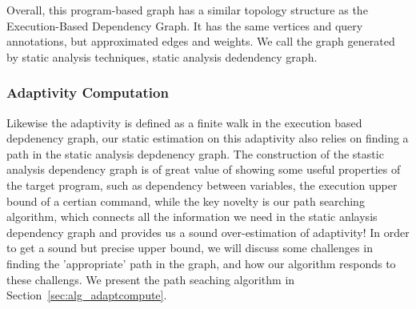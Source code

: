 Overall, this program-based graph has a similar topology structure as 
the Execution-Based Dependency Graph. It has the same
vertices and query annotations, but approximated edges and weights. We call the graph generated by static analysis techniques, static analysis dedendency graph. 


\subsubsection{Adaptivity Computation}

Likewise the adaptivity is defined as a finite walk in the execution based depdenency graph, our static estimation on this adaptivity also relies on finding a path in the static analysis depdenency graph.   The construction of the stastic analysis dependency graph is of great value of showing some useful properties of the target program, such as dependency between variables, the execution upper bound of a certian command, while the key novelty is our path searching algorithm, which connects all the information we need in the static anlaysis dependency graph and provides us a sound over-estimation of adaptivity! In order to get a sound but precise upper bound, we will discuss some challenges in finding the 'appropriate' path in the graph, and how our algorithm responds to these challengs. We present the path seaching algorithm in Section~\ref{sec:alg_adaptcompute}.
 

